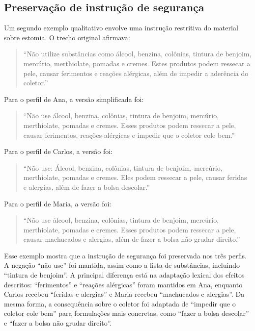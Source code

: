 \subsection{Preservação de instrução de segurança}
\label{subsec:preservacao-instrucao-seguranca}

Um segundo exemplo qualitativo envolve uma instrução restritiva do material sobre estomia. O trecho original afirmava:

\begin{quote}
``Não utilize substâncias como álcool, benzina, colônias, tintura de benjoim, mercúrio, merthiolate, pomadas e cremes. Estes produtos podem ressecar a pele, causar ferimentos e reações alérgicas, além de impedir a aderência do coletor.''
\end{quote}

Para o perfil de Ana, a versão simplificada foi:

\begin{quote}
``Não use álcool, benzina, colônias, tintura de benjoim, mercúrio, merthiolate, pomadas e cremes. Esses produtos podem ressecar a pele, causar ferimentos, reações alérgicas e impedir que o coletor cole bem.''
\end{quote}

Para o perfil de Carlos, a versão foi:

\begin{quote}
``Não use: Álcool, benzina, colônias, tintura de benjoim, mercúrio, merthiolate, pomadas e cremes. Eles podem ressecar a pele, causar feridas e alergias, além de fazer a bolsa descolar.''
\end{quote}

Para o perfil de Maria, a versão foi:

\begin{quote}
``Não use álcool, benzina, colônias, tintura de benjoim, mercúrio, merthiolate, pomadas e cremes. Esses produtos podem ressecar a pele, causar machucados e alergias, além de fazer a bolsa não grudar direito.''
\end{quote}

Esse exemplo mostra que a instrução de segurança foi preservada nos três perfis. A negação ``não use'' foi mantida, assim como a lista de substâncias, incluindo ``tintura de benjoim''. A principal diferença está na adaptação lexical dos efeitos descritos: ``ferimentos'' e ``reações alérgicas'' foram mantidos em Ana, enquanto Carlos recebeu ``feridas e alergias'' e Maria recebeu ``machucados e alergias''. Da mesma forma, a consequência sobre o coletor foi adaptada de ``impedir que o coletor cole bem'' para formulações mais concretas, como ``fazer a bolsa descolar'' e ``fazer a bolsa não grudar direito''.

